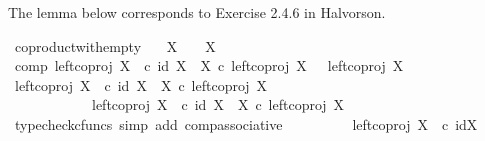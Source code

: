 \begin{isabellebody}
\endisatagproof
{\isafoldproof}%
%
\isadelimproof
%
\endisadelimproof
%
\begin{isamarkuptext}%
The lemma below corresponds to Exercise 2.4.6 in Halvorson.%
\end{isamarkuptext}\isamarkuptrue%
\isamarkupfalse%
\ coproduct{\isacharunderscore}{\kern0pt}with{\isacharunderscore}{\kern0pt}empty{\isacharcolon}{\kern0pt}\isanewline
\ \ \ {\isachardoublequoteopen}X\ {\isasymCoprod}\ {\isasymemptyset}\ {\isasymcong}\ X{\isachardoublequoteclose}\isanewline
%
\isadelimproof
%
\endisadelimproof
%
\isatagproof
{}\isamarkupfalse%
\ {\isacharminus}{\kern0pt}\isanewline
\ \ \isamarkupfalse%
\ comp{}{\isacharcolon}{\kern0pt}\ {\isachardoublequoteopen}{\isacharparenleft}{\kern0pt}left{\isacharunderscore}{\kern0pt}coproj\ X\ {\isasymemptyset}\ {\isasymcirc}\isactrlsub c\ {\isacharparenleft}{\kern0pt}id\ X\ {\isasymamalg}\ {\isasymalpha}\isactrlbsub X\isactrlesub {\isacharparenright}{\kern0pt}{\isacharparenright}{\kern0pt}\ {\isasymcirc}\isactrlsub c\ left{\isacharunderscore}{\kern0pt}coproj\ X\ {\isasymemptyset}\ {\isacharequal}{\kern0pt}\ left{\isacharunderscore}{\kern0pt}coproj\ X\ {\isasymemptyset}{\isachardoublequoteclose}\isanewline
\ \ \isamarkupfalse%
\ {\isacharminus}{\kern0pt}\isanewline
\ \ \ \ \isamarkupfalse%
\ {\isachardoublequoteopen}{\isacharparenleft}{\kern0pt}left{\isacharunderscore}{\kern0pt}coproj\ X\ {\isasymemptyset}\ {\isasymcirc}\isactrlsub c\ {\isacharparenleft}{\kern0pt}id\ X\ {\isasymamalg}\ {\isasymalpha}\isactrlbsub X\isactrlesub {\isacharparenright}{\kern0pt}{\isacharparenright}{\kern0pt}\ {\isasymcirc}\isactrlsub c\ left{\isacharunderscore}{\kern0pt}coproj\ X\ {\isasymemptyset}\ {\isacharequal}{\kern0pt}\isanewline
\ \ \ \ \ \ \ \ \ \ \ \ left{\isacharunderscore}{\kern0pt}coproj\ X\ {\isasymemptyset}\ {\isasymcirc}\isactrlsub c\ {\isacharparenleft}{\kern0pt}id\ X\ {\isasymamalg}\ {\isasymalpha}\isactrlbsub X\isactrlesub \ {\isasymcirc}\isactrlsub c\ left{\isacharunderscore}{\kern0pt}coproj\ X\ {\isasymemptyset}{\isacharparenright}{\kern0pt}{\isachardoublequoteclose}\isanewline
\ \ \ \ \ \ \isamarkupfalse%
\ {\isacharparenleft}{\kern0pt}typecheck{\isacharunderscore}{\kern0pt}cfuncs{\isacharcomma}{\kern0pt}\ simp\ add{\isacharcolon}{\kern0pt}\ comp{\isacharunderscore}{\kern0pt}associative{}{\isacharparenright}{\kern0pt}\isanewline
\ \ \ \ \isamarkupfalse%
\ \isamarkupfalse%
\ {\isachardoublequoteopen}{\isachardot}{\kern0pt}{\isachardot}{\kern0pt}{\isachardot}{\kern0pt}\ {\isacharequal}{\kern0pt}\ left{\isacharunderscore}{\kern0pt}coproj\ X\ {\isasymemptyset}\ {\isasymcirc}\isactrlsub c\ id{\isacharparenleft}{\kern0pt}X{\isacharparenright}{\kern0pt}{\isachardoublequoteclose}\isanewline

\end{isabellebody}
